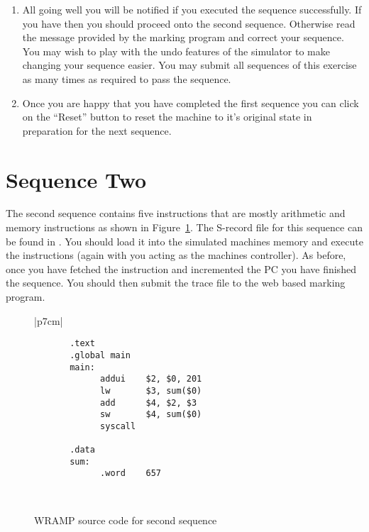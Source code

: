 \documentclass[a4paper,10pt]{article}
\begin{document}
\begin{enumerate}
First enter your username and select the sequence 1 check box and
browse to find the history you just saved. Click the submit button to
submit your history.

\item All going well you will be notified if you executed the sequence
successfully. If you have then you should proceed onto the second
sequence. Otherwise read the message provided by the marking program
and correct your sequence. You may wish to play with the undo features
of the simulator to make changing your sequence easier. You may submit
all sequences of this exercise as many times as required to pass the
sequence.

\item Once you are happy that you have completed the first sequence
you can click on the ``Reset'' button to reset the machine to it's
original state in preparation for the next sequence.

\end{enumerate}

\newpage
\section{Sequence Two}

The second sequence contains five instructions that are mostly
arithmetic and memory instructions as shown in Figure~\ref{fig:seq2}.
The S-record file for this sequence can be found in
. You should load it into the
simulated machines memory and execute the instructions (again with you
acting as the machines controller). As before, once you have fetched
the  instruction and incremented the PC you have
finished the sequence. You should then submit the trace file to the
web based marking program.

\begin{figure}[h]
\begin{footnotesize}
\begin{center}
\begin{tabular}{|p{7cm}|}
\hline
\begin{verbatim}
       .text
       .global main
       main:
             addui    $2, $0, 201
             lw       $3, sum($0)
             add      $4, $2, $3
             sw       $4, sum($0)
             syscall

       .data
       sum:
             .word    657
\end{verbatim} 
\\
\hline
\end{tabular}
\end{center}
\end{footnotesize}
\caption{WRAMP source code for second sequence}
\label{fig:seq2}
\end{figure}  
\end{document}
